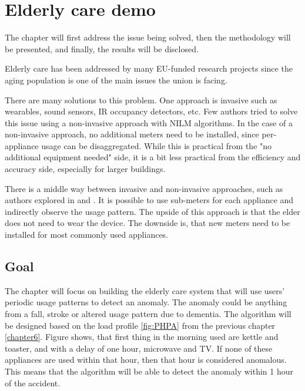 
\chapter{Elderly care demo} %

\label{Chapter7} %

The chapter will first address the issue being solved,
then the methodology will be presented, and finally,
the results will be disclosed.

Elderly care has been addressed by many EU-funded research projects since the aging population is one of the main issues the union is facing. 

There are many solutions to this problem.
One approach is invasive such as wearables, sound sensors, IR occupancy detectors, etc. 
Few authors tried to solve this issue using a non-invasive approach with NILM algorithms. 
In the case of a non-invasive approach, no additional meters need to be installed, since per-appliance usage can be disaggregated.
While this is practical from the "no additional equipment needed" side, it is a bit less practical from the efficiency and accuracy side, especially for larger buildings. 

There is a middle way between invasive and non-invasive approaches, such as authors explored in \cite{elder1} and \cite{elder2}. 
It is possible to use sub-meters for each appliance and indirectly observe the usage pattern. 
The upside of this approach is that the elder does not need to wear the device.
The downside is, that new meters need to be installed for most commonly used appliances.

\section{Goal}

The chapter will focus on building the elderly care system that will use users' periodic usage patterns to detect an anomaly.
The anomaly could be anything from a fall, stroke or altered usage pattern due to dementia. 
The algorithm will be designed based on the load profile \ref{fig:PHPA} from the previous chapter \ref{chapter6}.
Figure shows, that first thing in the morning used are kettle and toaster, and with a delay of one hour, microwave and TV. 
If none of these appliances are used within that hour, then that hour is considered anomalous.
This means that the algorithm will be able to detect the anomaly within 1 hour of the accident.

